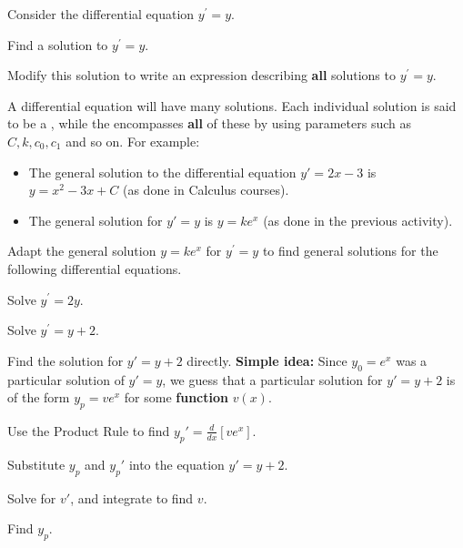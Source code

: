 \begin{applicationActivities}
\begin{activity}{15}
Consider the differential equation \(y^\prime=y\).
\begin{subactivity}
Find a solution to \(y^{\prime}=y\).
\end{subactivity}
\begin{subactivity}
Modify this solution to write an expression describing \textbf{all} solutions to \(y^{\prime}=y\).
\end{subactivity}
\end{activity}

\begin{definition}
A differential equation will have many solutions.
Each individual solution is said to be a ,
while the  encompasses \textbf{all} of these by using 
parameters such as \(C,k,c_0,c_1\) and so on. For example:

\begin{itemize}
\item The general solution to the differential equation \(y'=2x-3\) is \(y=x^2-3x+C\) (as done in
Calculus courses).
\item The general solution for \(y'=y\) is \(y=ke^x\) (as done in the previous activity). 
\end{itemize}

\end{definition}


\begin{activity}{15}
Adapt the general solution \(y=ke^x\) for \(y^\prime=y\) to find general solutions for
the following differential equations.
\begin{subactivity}
Solve \(y^{\prime}=2y\).
\end{subactivity}
\begin{subactivity}
Solve \(y^{\prime}=y+2\).
\end{subactivity}
\end{activity}

\begin{activity}{15}
Find the solution for \(y'=y+2\) directly.
\vfill
\textbf{Simple idea:} Since \(y_0=e^x\) was a particular solution of \(y'=y\), 
we guess that a particular solution for \(y'=y+2\) is of the form \(y_p =  v e^x\) 
for some \textbf{function} \(v(x)\). 
\vfill
\begin{subactivity}
Use the Product Rule to find \(y_p'=\frac{d}{dx}[ve^x]\).
\end{subactivity}
\begin{subactivity}
Substitute \(y_p\) and \(y_p'\) into the equation \(y'=y+2\).
\end{subactivity}
\begin{subactivity}
Solve for \(v'\), and integrate to find \(v\).
\end{subactivity}
\begin{subactivity}
Find \(y_p\).
\end{subactivity}
\end{activity}


\end{applicationActivities}
